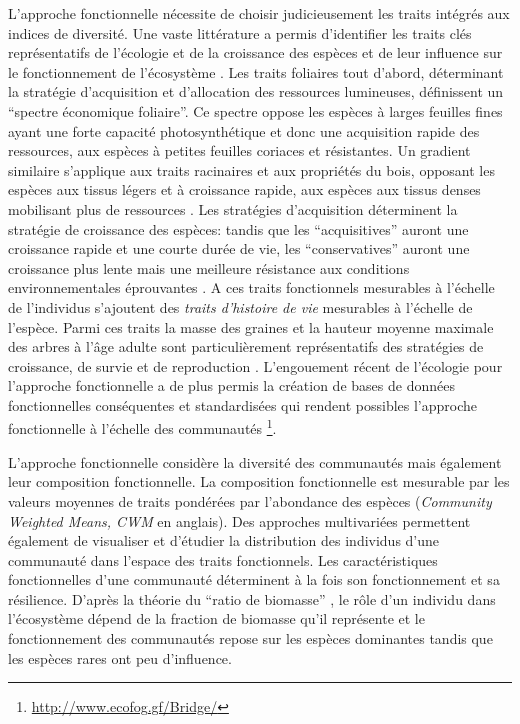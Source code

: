 \documentclass[
  11pt,
  french,
  A4paper,
  extrafontsizes,onecolumn,openright
  ]{memoir}
\begin{document}
L'approche fonctionnelle nécessite de choisir judicieusement les traits
intégrés aux indices de diversité. Une vaste littérature a permis
d'identifier les traits clés représentatifs de l'écologie et de la
croissance des espèces et de leur influence sur le fonctionnement de
l'écosystème \autocite{Reich2014}. Les traits foliaires tout d'abord,
déterminant la stratégie d'acquisition et d'allocation des ressources
lumineuses, définissent un ``spectre économique foliaire''. Ce spectre
oppose les espèces à larges feuilles fines ayant une forte capacité
photosynthétique et donc une acquisition rapide des ressources, aux
espèces à petites feuilles coriaces et résistantes. Un gradient
similaire s'applique aux traits racinaires et aux propriétés du bois,
opposant les espèces aux tissus légers et à croissance rapide, aux
espèces aux tissus denses mobilisant plus de ressources
\autocites{Chave2009}{Valverde-Barrantes2017}. Les stratégies
d'acquisition déterminent la stratégie de croissance des espèces: tandis
que les ``acquisitives'' auront une croissance rapide et une courte
durée de vie, les ``conservatives'' auront une croissance plus lente
mais une meilleure résistance aux conditions environnementales
éprouvantes \autocites{Reich1997}{Wright2004}. A ces traits fonctionnels
mesurables à l'échelle de l'individus s'ajoutent des \emph{traits
d'histoire de vie} mesurables à l'échelle de l'espèce. Parmi ces traits
la masse des graines et la hauteur moyenne maximale des arbres à l'âge
adulte sont particulièrement représentatifs des stratégies de
croissance, de survie et de reproduction
\autocites{Westoby1998}{Herault2011}. L'engouement récent de l'écologie
pour l'approche fonctionnelle a de plus permis la création de bases de
données fonctionnelles conséquentes et standardisées qui rendent
possibles l'approche fonctionnelle à l'échelle des communautés
\autocites{Kattge2011}{Perez-Harguindeguy2013} \footnote{\url{http://www.ecofog.gf/Bridge/}}.

L'approche fonctionnelle considère la diversité des communautés mais
également leur composition fonctionnelle. La composition fonctionnelle
est mesurable par les valeurs moyennes de traits pondérées par
l'abondance des espèces (\emph{Community Weighted Means, CWM} en
anglais). Des approches multivariées permettent également de visualiser
et d'étudier la distribution des individus d'une communauté dans
l'espace des traits fonctionnels. Les caractéristiques fonctionnelles
d'une communauté déterminent à la fois son fonctionnement et sa
résilience. D'après la théorie du ``ratio de biomasse''
\autocite{Grime1998}, le rôle d'un individu dans l'écosystème dépend de
la fraction de biomasse qu'il représente et le fonctionnement des
communautés repose sur les espèces dominantes tandis que les espèces
rares ont peu d'influence.
\end{document}
